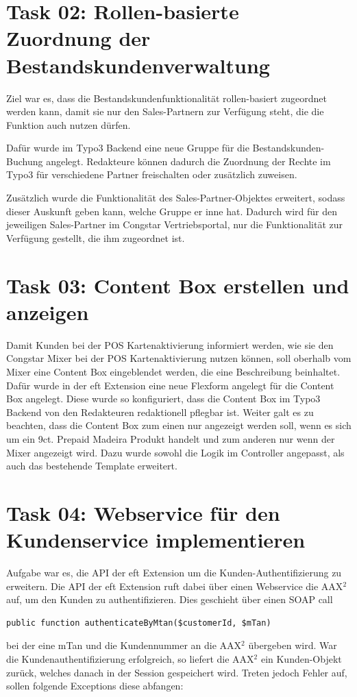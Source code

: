 \documentclass[11pt,a4paper]{article} %
\begin{document}
\section{Task 02: Rollen-basierte Zuordnung der Bestandskundenverwaltung} \label{sec:t02}

Ziel war es, dass die Bestandskundenfunktionalität rollen-basiert zugeordnet werden kann, 
damit sie nur den Sales-Partnern zur Verfügung steht, die die Funktion auch nutzen dürfen.

Dafür wurde im Typo3 Backend eine neue Gruppe für die Bestandskunden-Buchung angelegt.
Redakteure können dadurch die Zuordnung der Rechte im Typo3 für verschiedene Partner freischalten
oder zusätzlich zuweisen.

Zusätzlich wurde die Funktionalität des Sales-Partner-Objektes erweitert, sodass dieser Auskunft geben kann, 
welche Gruppe er inne hat. Dadurch wird für den jeweiligen Sales-Partner im Congstar Vertriebsportal,
nur die Funktionalität zur Verfügung gestellt, die ihm zugeordnet ist.




\section{Task 03: Content Box erstellen und anzeigen}

Damit Kunden bei der POS Kartenaktivierung informiert werden, wie sie den Congstar Mixer bei der POS Kartenaktivierung
nutzen können, soll oberhalb vom Mixer eine Content Box eingeblendet werden, die eine Beschreibung beinhaltet.
Dafür wurde in der eft Extension eine neue Flexform angelegt für die Content Box angelegt.
Diese wurde so konfiguriert, dass die Content Box im Typo3 Backend von den Redakteuren redaktionell pflegbar ist.
Weiter galt es zu beachten, dass die Content Box zum einen nur angezeigt werden soll,
wenn es sich um ein 9ct. Prepaid Madeira Produkt handelt und zum anderen nur wenn der Mixer angezeigt wird.
Dazu wurde sowohl die Logik im Controller angepasst, als auch das bestehende Template erweitert.




\section{Task 04: Webservice für den Kundenservice implementieren}

Aufgabe war es, die API der eft Extension um die Kunden-Authentifizierung zu erweitern.
Die API der eft Extension ruft dabei über einen Webservice die AAX$^2$ auf, um den Kunden zu authentifizieren.
Dies geschieht über einen SOAP call 
\begin{lstlisting}
public function authenticateByMtan($customerId, $mTan)
\end{lstlisting}
bei der eine mTan und die Kundennummer an die AAX$^2$ übergeben wird.
War die Kundenauthentifizierung erfolgreich, so liefert die AAX$^2$ ein Kunden-Objekt zurück, welches
danach in der Session gespeichert wird.
Treten jedoch Fehler auf, sollen folgende Exceptions diese abfangen:
\end{document}
